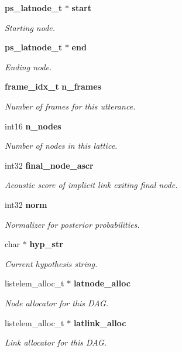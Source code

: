 \begin{DoxyCompactItemize}
{\bf ps\-\_\-latnode\-\_\-t} $\ast$ {\bf start}
\begin{DoxyCompactList}\small\item\em Starting node. \end{DoxyCompactList}\item 
{\bf ps\-\_\-latnode\-\_\-t} $\ast$ {\bf end}
\begin{DoxyCompactList}\small\item\em Ending node. \end{DoxyCompactList}\item 
{\bf frame\-\_\-idx\-\_\-t} {\bf n\-\_\-frames}
\begin{DoxyCompactList}\small\item\em Number of frames for this utterance. \end{DoxyCompactList}\item 
int16 {\bf n\-\_\-nodes}
\begin{DoxyCompactList}\small\item\em Number of nodes in this lattice. \end{DoxyCompactList}\item 
int32 {\bf final\-\_\-node\-\_\-ascr}
\begin{DoxyCompactList}\small\item\em Acoustic score of implicit link exiting final node. \end{DoxyCompactList}\item 
int32 {\bf norm}
\begin{DoxyCompactList}\small\item\em Normalizer for posterior probabilities. \end{DoxyCompactList}\item 
char $\ast$ {\bf hyp\-\_\-str}
\begin{DoxyCompactList}\small\item\em Current hypothesis string. \end{DoxyCompactList}\item 
listelem\-\_\-alloc\-\_\-t $\ast$ {\bf latnode\-\_\-alloc}
\begin{DoxyCompactList}\small\item\em Node allocator for this D\-A\-G. \end{DoxyCompactList}\item 
listelem\-\_\-alloc\-\_\-t $\ast$ {\bf latlink\-\_\-alloc}
\begin{DoxyCompactList}\small\item\em Link allocator for this D\-A\-G. \end{DoxyCompactList}\item 

\end{DoxyCompactItemize}

